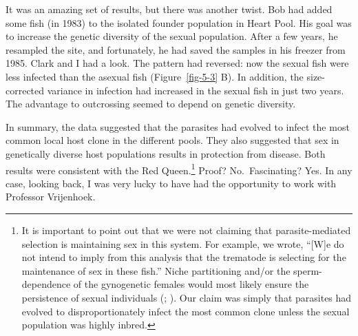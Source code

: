 \documentclass[
  american,
  letterpaper,
]{book}
\begin{document}
It was an amazing set of results, but there was another twist. Bob had
added some fish (in 1983) to the isolated founder population in Heart
Pool. His goal was to increase the genetic diversity of the sexual
population. After a few years, he resampled the site, and fortunately,
he had saved the samples in his freezer from 1985. Clark and I had a
look. The pattern had reversed: now the sexual fish were less infected
than the asexual fish (Figure~\ref{fig-5-3} B). In addition, the
size-corrected variance in infection had increased in the sexual fish in
just two years. The advantage to outcrossing seemed to depend on genetic
diversity.

In summary, the data suggested that the parasites had evolved to infect
the most common local host clone in the different pools. They also
suggested that sex in genetically diverse host populations results in
protection from disease. Both results were consistent with the Red
Queen.\footnote{It is important to point out that we were not claiming
  that parasite-mediated selection is maintaining sex in this system.
  For example, we wrote, ``{[}W{]}e do not intend to imply from this
  analysis that the trematode is selecting for the maintenance of sex in
  these fish.'' Niche partitioning and/or the sperm-dependence of the
  gynogenetic females would most likely ensure the persistence of sexual
  individuals (;
  ). Our claim
  was simply that parasites had evolved to disproportionately infect the
  most common clone unless the sexual population was highly inbred.}
Proof? No.~Fascinating? Yes. In any case, looking back, I was very lucky
to have had the opportunity to work with Professor Vrijenhoek.
\end{document}
